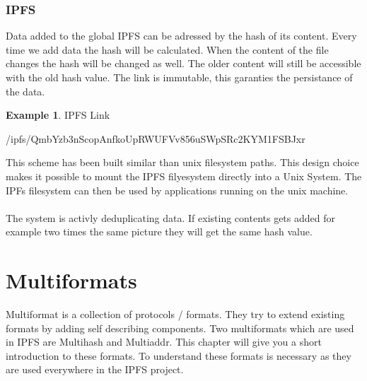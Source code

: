 \documentclass[a4paper,11pt, oneside]{report}
\theoremstyle{definition}
\newtheorem{exmp}{Example}[subsection]
\begin{document}
\subsection{IPFS}
Data added to the global IPFS can be adressed by the hash of its content. Every time we add data the hash will be calculated. When the content of the file changes the hash will be changed as well.  The older content will still be accessible with the old hash value. The link is immutable, this garanties the persistance of the data.
\begin{exmp} IPFS Link
\begin{center}
	/ipfs/QmbYzb3nScopAnfkoUpRWUFVv856uSWpSRc2KYM1FSBJxr
\end{center}
This scheme has been built similar than unix filesystem paths. This design choice makes it possible to mount the IPFS filyesystem directly into a Unix System. The IPFs filesystem can then be used by applications running on the unix machine.\\ \\
The system is activly deduplicating data. If existing contents gets added for example two times the same picture they will get the same hash value.
\end{exmp}

\newpage

\chapter{Multiformats}

Multiformat is a collection of protocols / formats. They try to extend existing formats by adding self describing components.  Two multiformats which are used in IPFS are Multihash and Multiaddr. This chapter will give you a short introduction to these formats. To understand these formats is necessary as they are used everywhere in the IPFS project.
\end{document}

